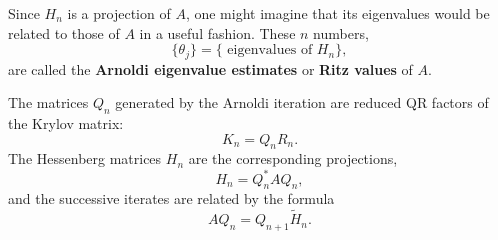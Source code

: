 Since $ H_n $ is a projection of $ A $, one might imagine that its eigenvalues would be related to those of $ A $ in a useful fashion. These $ n $ numbers,
 \begin{equation}
 \label{eq: eigenvalues of H_n}
    \{\theta _j\}  = \{\text{ eigenvalues of  }H_n\} , 
 \end{equation}
 are called the \textbf{Arnoldi eigenvalue estimates} or \textbf{Ritz values} of $ A $.  

 
 \begin{theorem}
 \label{thm: Arnoldi iteration}
 The matrices $ Q_n $ generated by the Arnoldi iteration are reduced QR factors of the Krylov matrix: 
 \begin{equation}
 \label{eq: QR Arnoldi}
    K_n =Q_n R_n.
 \end{equation}
 The Hessenberg matrices $ H_n $ are the corresponding projections, 
 \begin{equation}
 \label{eq: Arnoldi projection}
    H_n = Q_n^* A Q_n,
 \end{equation}
 and the successive iterates are related by the formula 
 \begin{equation}
 \label{eq: Arnoldi iterates}
    AQ_n =Q_{n+1}\tilde H_n. 
 \end{equation}
 
 
 \end{theorem}
 
